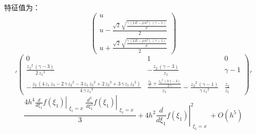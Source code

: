 \documentclass[12pt, a4paper]{article}
\begin{document}
    特征值为：
    \begin{equation}
        \left(
            \begin{array}{c} 
                u\\ 
                u-\frac{\sqrt{2}\,\sqrt{\frac{\gamma \,\left(2\,E-\rho \,u^2\right)\,\left(\gamma -1\right)}{\rho }}}{2}\\ 
                u+\frac{\sqrt{2}\,\sqrt{\frac{\gamma \,\left(2\,E-\rho \,u^2\right)\,\left(\gamma -1\right)}{\rho }}}{2} 
            \end{array}
        \right)
    \end{equation}
    \begin{equation}
        '\left(\begin{array}{ccc} 0 & 1 & 0\\ \frac{{z_{2}}^2\,\left(\gamma -3\right)}{2\,{z_{1}}^2} & -\frac{z_{2}\,\left(\gamma -3\right)}{z_{1}} & \gamma -1\\ -\frac{z_{2}\,\left(4\,z_{1}\,z_{3}-2\,\gamma \,{z_{2}}^2-3\,z_{1}\,{z_{2}}^2+2\,{z_{2}}^2+3\,\gamma \,z_{1}\,{z_{2}}^2\right)}{4\,\gamma \,{z_{1}}^3} & \frac{\frac{z_{3}}{\gamma }+\frac{{z_{2}}^2\,\left(3\,\gamma -3\right)}{2\,\gamma }}{z_{1}}-\frac{{z_{2}}^2\,\left(\gamma -1\right)}{\gamma \,{z_{1}}^2} & \frac{z_{2}}{z_{1}} \end{array}\right)'
    \end{equation}
    \begin{equation}
        \frac{4 h^{4} \left. \frac{d}{d \xi_{1}} f{\left(\xi_{1} \right)} \right|_{\substack{ \xi_{1}=x }} \left. \frac{d^{3}}{d \xi_{1}^{3}} f{\left(\xi_{1} \right)} \right|_{\substack{ \xi_{1}=x }}}{3} + 4 h^{2} \left. \frac{d}{d \xi_{1}} f{\left(\xi_{1} \right)} \right|_{\substack{ \xi_{1}=x }}^{2}+ O(h^5)
    \end{equation}
\end{document}
